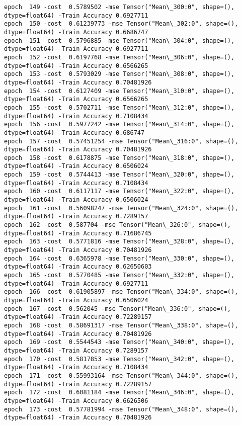 \documentclass[11pt]{article}
\begin{document}
\begin{Verbatim}[commandchars=\\\{\}]
epoch  149 -cost  0.5789502 -mse Tensor("Mean\_300:0", shape=(), dtype=float64) -Train Accuracy 0.6927711
epoch  150 -cost  0.61239773 -mse Tensor("Mean\_302:0", shape=(), dtype=float64) -Train Accuracy 0.6686747
epoch  151 -cost  0.5796885 -mse Tensor("Mean\_304:0", shape=(), dtype=float64) -Train Accuracy 0.6927711
epoch  152 -cost  0.6197768 -mse Tensor("Mean\_306:0", shape=(), dtype=float64) -Train Accuracy 0.6566265
epoch  153 -cost  0.5793029 -mse Tensor("Mean\_308:0", shape=(), dtype=float64) -Train Accuracy 0.70481926
epoch  154 -cost  0.6127409 -mse Tensor("Mean\_310:0", shape=(), dtype=float64) -Train Accuracy 0.6566265
epoch  155 -cost  0.5702711 -mse Tensor("Mean\_312:0", shape=(), dtype=float64) -Train Accuracy 0.7108434
epoch  156 -cost  0.5977242 -mse Tensor("Mean\_314:0", shape=(), dtype=float64) -Train Accuracy 0.686747
epoch  157 -cost  0.57451254 -mse Tensor("Mean\_316:0", shape=(), dtype=float64) -Train Accuracy 0.70481926
epoch  158 -cost  0.6178875 -mse Tensor("Mean\_318:0", shape=(), dtype=float64) -Train Accuracy 0.6506024
epoch  159 -cost  0.5744413 -mse Tensor("Mean\_320:0", shape=(), dtype=float64) -Train Accuracy 0.7108434
epoch  160 -cost  0.6117117 -mse Tensor("Mean\_322:0", shape=(), dtype=float64) -Train Accuracy 0.6506024
epoch  161 -cost  0.56098247 -mse Tensor("Mean\_324:0", shape=(), dtype=float64) -Train Accuracy 0.7289157
epoch  162 -cost  0.587704 -mse Tensor("Mean\_326:0", shape=(), dtype=float64) -Train Accuracy 0.71686745
epoch  163 -cost  0.5771816 -mse Tensor("Mean\_328:0", shape=(), dtype=float64) -Train Accuracy 0.70481926
epoch  164 -cost  0.6365978 -mse Tensor("Mean\_330:0", shape=(), dtype=float64) -Train Accuracy 0.62650603
epoch  165 -cost  0.5770485 -mse Tensor("Mean\_332:0", shape=(), dtype=float64) -Train Accuracy 0.6927711
epoch  166 -cost  0.61905897 -mse Tensor("Mean\_334:0", shape=(), dtype=float64) -Train Accuracy 0.6506024
epoch  167 -cost  0.562045 -mse Tensor("Mean\_336:0", shape=(), dtype=float64) -Train Accuracy 0.72289157
epoch  168 -cost  0.58691317 -mse Tensor("Mean\_338:0", shape=(), dtype=float64) -Train Accuracy 0.70481926
epoch  169 -cost  0.5544543 -mse Tensor("Mean\_340:0", shape=(), dtype=float64) -Train Accuracy 0.7289157
epoch  170 -cost  0.5817853 -mse Tensor("Mean\_342:0", shape=(), dtype=float64) -Train Accuracy 0.7108434
epoch  171 -cost  0.55993164 -mse Tensor("Mean\_344:0", shape=(), dtype=float64) -Train Accuracy 0.72289157
epoch  172 -cost  0.6081184 -mse Tensor("Mean\_346:0", shape=(), dtype=float64) -Train Accuracy 0.6626506
epoch  173 -cost  0.57781994 -mse Tensor("Mean\_348:0", shape=(), dtype=float64) -Train Accuracy 0.70481926

\end{Verbatim}
\end{document}
